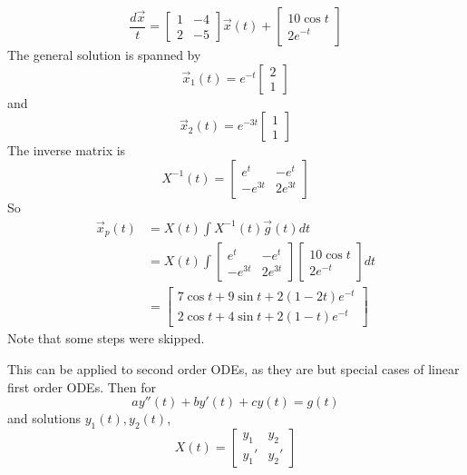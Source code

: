 \documentclass[12pt]{article}
\begin{document}
\begin{ex}
	$$\frac{d\vec{x}}{t} = \begin{bmatrix} 1 & -4 \\ 2 & -5\end{bmatrix}\vec{x}(t) + \begin{bmatrix} 10\cos t \\ 2e^{-t}\end{bmatrix}$$
	The general solution is spanned by
	$$\vec{x}_1(t) = e^{-t}\begin{bmatrix} 2 \\ 1\end{bmatrix}$$
	and
	$$\vec{x}_2(t) = e^{-3t}\begin{bmatrix} 1 \\ 1\end{bmatrix}$$
	The inverse matrix is
	$$X^{-1}(t) = \begin{bmatrix} e^t & -e^t \\ -e^{3t} & 2e^{3t}\end{bmatrix}$$
	So
	\begin{align*}
		\vec{x}_p(t) &= X(t)\int X^{-1}(t)\vec{g}(t)dt \\
			     &= X(t)\int\begin{bmatrix} e^t & -e^t \\ -e^{3t} & 2e^{3t}\end{bmatrix}\begin{bmatrix} 10\cos t \\ 2e^{-t}\end{bmatrix}dt \\
			     &= \begin{bmatrix}7\cos t + 9\sin t + 2(1-2t)e^{-t} \\ 2\cos t + 4\sin t + 2(1-t)e^{-t}\end{bmatrix}
	\end{align*}
	Note that some steps were skipped.
\end{ex}

This can be applied to second order ODEs, as they are but special cases of linear first order ODEs. Then for
$$ay''(t) + by'(t) + cy(t) = g(t)$$
and solutions $y_1(t), y_2(t)$,
$$X(t) = \begin{bmatrix} y_1 & y_2 \\ y_1' & y_2'\end{bmatrix}$$
\end{document}
